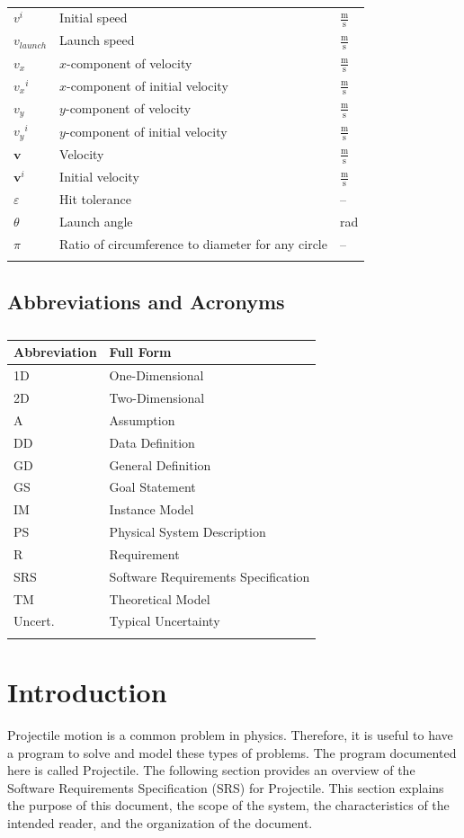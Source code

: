 \documentclass[12pt]{article}
\begin{document}
\begin{longtabu}{l X[l] l}
\\
${v^{i}}$ & Initial speed & $\frac{\text{m}}{\text{s}}$
\\
${v_{launch}}$ & Launch speed & $\frac{\text{m}}{\text{s}}$
\\
${v_{x}}$ & $x$-component of velocity & $\frac{\text{m}}{\text{s}}$
\\
${{v_{x}}^{i}}$ & $x$-component of initial velocity & $\frac{\text{m}}{\text{s}}$
\\
${v_{y}}$ & $y$-component of velocity & $\frac{\text{m}}{\text{s}}$
\\
${{v_{y}}^{i}}$ & $y$-component of initial velocity & $\frac{\text{m}}{\text{s}}$
\\
$\mathbf{v}$ & Velocity & $\frac{\text{m}}{\text{s}}$
\\
${\mathbf{v}^{i}}$ & Initial velocity & $\frac{\text{m}}{\text{s}}$
\\
$ε$ & Hit tolerance & --
\\
$θ$ & Launch angle & rad
\\
$π$ & Ratio of circumference to diameter for any circle & --
\\
\bottomrule
\caption{}
\label{Table:ToS}
\end{longtabu}
\subsection{Abbreviations and Acronyms}
\label{Sec:TAbbAcc}
\begin{longtable}{l l}
\toprule
Abbreviation & Full Form
\\
\midrule
\endhead
1D & One-Dimensional
\\
2D & Two-Dimensional
\\
A & Assumption
\\
DD & Data Definition
\\
GD & General Definition
\\
GS & Goal Statement
\\
IM & Instance Model
\\
PS & Physical System Description
\\
R & Requirement
\\
SRS & Software Requirements Specification
\\
TM & Theoretical Model
\\
Uncert. & Typical Uncertainty
\\
\bottomrule
\caption{}
\label{Table:TAbbAcc}
\end{longtable}
\section{Introduction}
\label{Sec:Intro}
Projectile motion is a common problem in physics. Therefore, it is useful to have a program to solve and model these types of problems. The program documented here is called Projectile.
The following section provides an overview of the Software Requirements Specification (SRS) for Projectile. This section explains the purpose of this document, the scope of the system, the characteristics of the intended reader, and the organization of the document.
\end{document}
